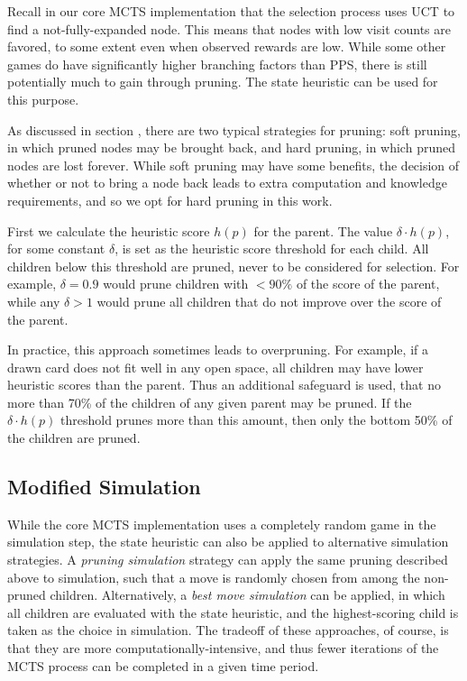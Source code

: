 \documentclass[letterpaper]{article}
\begin{document}
Recall in our core MCTS implementation that the selection process uses UCT to find a not-fully-expanded node. This means that nodes with low visit counts are favored, to some extent even when observed rewards are low. While some other games do have significantly higher branching factors than PPS, there is still potentially much to gain through pruning. The state heuristic can be used for this purpose.

As discussed in section {\it {}}, there are two typical strategies for pruning: soft pruning, in which pruned nodes may be brought back, and hard pruning, in which pruned nodes are lost forever. While soft pruning may have some benefits, the decision of whether or not to bring a node back leads to extra computation and knowledge requirements, and so we opt for hard pruning in this work.

First we calculate the heuristic score $h(p)$ for the parent. The value $\delta \cdot h(p)$, for some constant $\delta$, is set as the heuristic score threshold for each child. All children below this threshold are pruned, never to be considered for selection. For example, $\delta = 0.9$ would prune children with $ < 90\%$ of the score of the parent, while any $\delta > 1$ would prune all children that do not improve over the score of the parent.

In practice, this approach sometimes leads to overpruning. For example, if a drawn card does not fit well in any open space, all children may have lower heuristic scores than the parent. Thus an additional safeguard is used, that no more than 70\% of the children of any given parent may be pruned. If the  $\delta \cdot h(p)$ threshold prunes more than this amount, then only the bottom 50\% of the children are pruned.

\subsection{Modified Simulation}

While the core MCTS implementation uses a completely random game in the simulation step, the state heuristic can also be applied to alternative simulation strategies. A {\it pruning simulation} strategy can apply the same pruning described above to simulation, such that a move is randomly chosen from among the non-pruned children. Alternatively, a {\it best move simulation} can be applied, in which all children are evaluated with the state heuristic, and the highest-scoring child is taken as the choice in simulation. The tradeoff of these approaches, of course, is that they are more computationally-intensive, and thus fewer iterations of the MCTS process can be completed in a given time period. 
\end{document}
